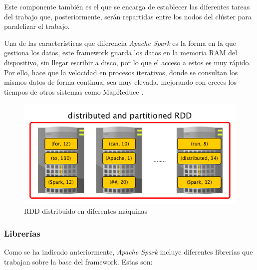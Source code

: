 Este componente también es el que se encarga de establecer las diferentes tareas del trabajo que, posteriormente, serán repartidas entre los nodos del clúster para paralelizar el trabajo.

Una de las características que diferencia \textit{Apache Spark} es la forma en la que gestiona los datos, este \gls{framework} guarda los datos en la memoria \gls{RAM} del dispositivo, sin llegar escribir a disco, por lo que el acceso a estos es muy rápido. Por ello, hace que la velocidad en procesos iterativos, donde se consultan los mismos datos de forma continua, sea muy elevada, mejorando con creces los tiempos de otros sistemas como MapReduce \cite{compSpark}.

\begin{figure}[htp!]
	\centering
	\caption{\gls{RDD} distribuido en diferentes máquinas \cite{sparkbook}}
	\label{rdddistribuido}
	\vspace{5pt}
	\includegraphics[scale=0.6]{graphics/rdddistribuido}
\end{figure}

\subsubsection{Librerías}
Como se ha indicado anteriormente, \textit{Apache Spark} incluye diferentes librerías que trabajan sobre la base del \gls{framework}. Estas son:

